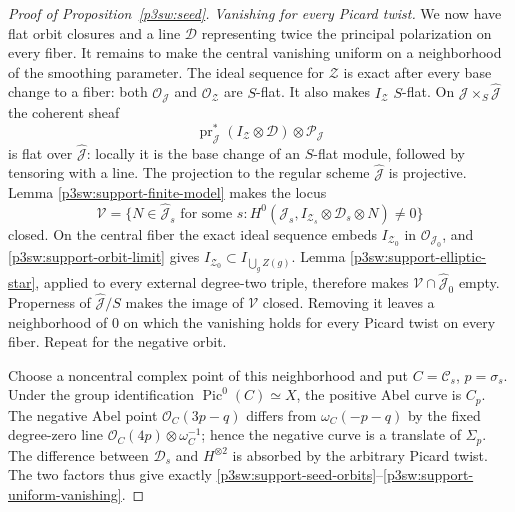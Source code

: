 \documentclass[11pt]{article}
\numberwithin{equation}{section}
\begin{document}
\begin{proof}[Proof of Proposition~\ref{p3sw:seed}]
\emph{Vanishing for every Picard twist.}
We now have flat orbit closures and a line \(\mathcal D\) representing
twice the principal polarization on every fiber.  It remains to make the
central vanishing uniform on a neighborhood of the smoothing parameter.
The ideal sequence for \(\mathcal Z\) is exact after every base
change to a fiber: both \(\mathcal O_{\mathcal J}\) and
\(\mathcal O_{\mathcal Z}\) are \(S\)-flat.  It also makes
\(I_{\mathcal Z}\) \(S\)-flat.  On
\(\mathcal J\times_S\widehat{\mathcal J}\) the coherent sheaf
\begin{equation}
 \operatorname{pr}_{\mathcal J}^*
        (I_{\mathcal Z}\otimes\mathcal D)\otimes\mathcal P_{\mathcal J}
 \label{p3sw:support-universal-ideal}
\end{equation}
is flat over \(\widehat{\mathcal J}\): locally it is the base change
of an \(S\)-flat module, followed by tensoring with a line.
The projection to the regular scheme \(\widehat{\mathcal J}\) is
projective.  Lemma \ref{p3sw:support-finite-model} makes the locus
\begin{equation}
 \mathcal V=\{N\in\widehat{\mathcal J}_s\text{ for some }s:
 H^0(\mathcal J_s,I_{\mathcal Z_s}\otimes\mathcal D_s\otimes N)
 \ne0\}
 \label{p3sw:support-bad-picard-locus}
\end{equation}
closed.  On the central fiber the exact ideal sequence embeds
\(I_{\mathcal Z_0}\) in \(\mathcal O_{\mathcal J_0}\), and \eqref{p3sw:support-orbit-limit}
gives
\(I_{\mathcal Z_0}\subset I_{\bigcup_gZ(g)}\).
Lemma \ref{p3sw:support-elliptic-star}, applied to every external
degree-two triple, therefore makes
\(\mathcal V\cap\widehat{\mathcal J}_0\) empty.
Properness of \(\widehat{\mathcal J}/S\) makes the image of
\(\mathcal V\) closed.  Removing it leaves a neighborhood of \(0\)
on which the vanishing holds for every Picard twist on every fiber.
Repeat for the negative orbit.

Choose a noncentral complex point of this neighborhood and put
\(C=\mathcal C_s\), \(p=\sigma_s\).  Under the group identification
\(\operatorname{Pic}^0(C)\simeq X\), the positive Abel curve is
\(C_p\).  The negative Abel point \(\mathcal O_C(3p-q)\) differs
from \(\omega_C(-p-q)\) by the fixed degree-zero line
\(\mathcal O_C(4p)\otimes\omega_C^{-1}\); hence the negative curve
is a translate of \(\Sigma_p\).
The difference between \(\mathcal D_s\) and \(H^{\otimes2}\) is
absorbed by the arbitrary Picard twist.  The two factors thus give
exactly \eqref{p3sw:support-seed-orbits}--\eqref{p3sw:support-uniform-vanishing}.
\end{proof}
\end{document}
